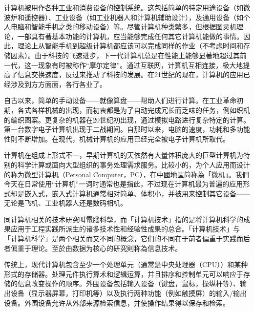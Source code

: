 \documentclass[oneside,a4paper,12pt,AutoFakeBold]{book}%
\begin{document}
{计算机被用作各种工业和消费设备的控制系统。这包括简单的特定用途设备（如微波炉和遥控器）、工业设备（如工业机器人和计算机辅助设计），及通用设备（如个人电脑和智能手机之类的移动设备）等。尽管计算机种类繁多，但根据图灵机理论，一部具有著基本功能的计算机，应当能够完成任何其它计算机能做的事情。因此，理论上从智能手机到超级计算机都应该可以完成同样的作业（不考虑时间和存储因素）。由于科技的飞速进步，下一代计算机总是在性能上能够显著地超过其前一代，这一现象有时被称作“摩尔定律”。通过互联网，计算机互相连接，极大地提高了信息交换速度，反过来推动了科技的发展。在21世纪的现在，计算机的应用已经涉及到方方面面，各行各业了。

自古以来，简单的手动设备——就像算盘——帮助人们进行计算。在工业革命初期，各式各样机械的出现，而初衷都是为了自动完成冗长而乏味的任务，例如织机的编织图案。更复杂的机器在20世纪初出现，通过模拟电路进行复杂特定的计算。第一台数字电子计算机出现于二战期间。自那时以来，电脑的速度，功耗和多功能性則不断增加。在现代，机械计算机的应用已经完全被电子计算机所取代。

计算机在组成上形式不一，早期计算机的天依然有大量体积庞大的巨型计算机为特别的科学计算或面向大型组织的事务处理需求服务。比较小的，为个人应用而设计的称为微型计算机（Personal Computer，PC），在中國地區简称為「微机」。我們今天在日常使用“计算机”一词时通常也是指此，不过现在计算机最为普遍的应用形式却是嵌入式，嵌入式计算机通常相对简单、体积小，并被用来控制其它设备——无论是飞机、工业机器人还是数码相机。

同计算机相关的技术研究叫電腦科學，而「计算机技术」指的是将计算机科学的成果应用于工程实践所派生的诸多技术性和经验性成果的总合。「计算机技术」与「计算机科学」是两个相关而又不同的概念，它们的不同在于前者偏重于实践而后者偏重于理论。至於由数据为核心的研究則称為信息技术。

传统上，现代计算机包含至少一个处理单元（通常是中央处理器（CPU））和某种形式的存储器。处理元件执行算术和逻辑运算，并且排序和控制单元可以响应于存储的信息改变操作的顺序。外围设备包括输入设备（键盘，鼠标，操纵杆等）、输出设备（显示器屏幕，打印机等）以及执行两种功能（例如触摸屏）的输入/输出设备。外围设备允许从外部来源检索信息，并使操作结果得以保存和检索。
}

\end{document}
